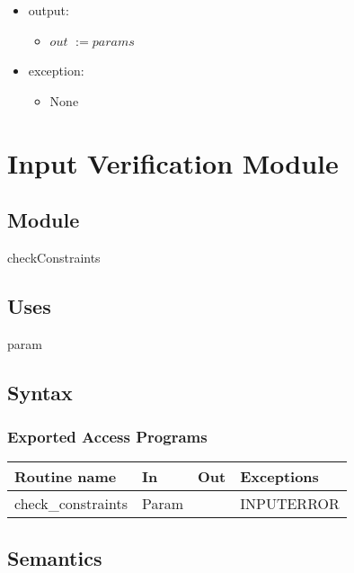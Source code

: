 \documentclass[12pt,fleqn]{article}
\begin{document}
\begin{itemize}
\begin{itemize}
                        \end{itemize}
\item output: \begin{itemize}
                   \item[] $out$ \tabto{3.5cm} $ := params$
                    \end{itemize}
\item exception: \begin{itemize}
                        \item[] None
                        \end{itemize}
\end{itemize}


\newpage

\section* {Input Verification Module}

\subsection*{Module}

checkConstraints

\subsection* {Uses}

param

\subsection* {Syntax}

\subsubsection* {Exported Access Programs}

\begin{tabular}{| l | l | l | l |}
\hline
\textbf{Routine name} & \textbf{In} & \textbf{Out} & \textbf{Exceptions}\\
\hline
check\_constraints & Param &  & INPUTERROR\\
\hline

\end{tabular}

\subsection* {Semantics}
\end{document}
